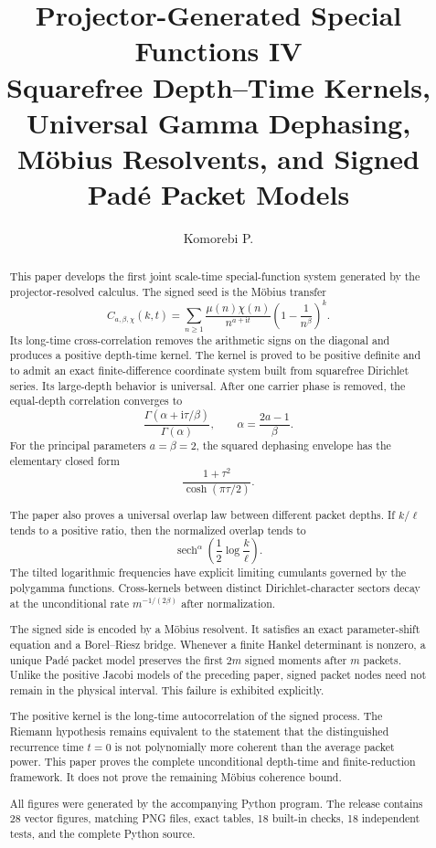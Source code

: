 \documentclass[11pt,openany]{report}
\title{\textbf{Projector-Generated Special Functions IV}\\[0.25em]
\Large Squarefree Depth--Time Kernels, Universal Gamma Dephasing, M\"obius Resolvents, and Signed Pad\'e Packet Models}
\author{Komorebi P.}
\date{}
\theoremstyle{definition}
\theoremstyle{remark}
\newcommand{\ii}{\mathrm i}
\newcommand{\sech}{\operatorname{sech}}
\begin{document}
\hypersetup{pageanchor=false}
\maketitle

\begin{abstract}
This paper develops the first joint scale-time special-function system generated by the projector-resolved calculus. The signed seed is the M\"obius transfer
\[
C_{a,\beta,\chi}(k,t)
=
\sum_{n\ge1}
\frac{\mu(n)\chi(n)}{n^{a+\ii t}}
\left(1-\frac1{n^\beta}\right)^k.
\]
Its long-time cross-correlation removes the arithmetic signs on the diagonal and produces a positive depth-time kernel. The kernel is proved to be positive definite and to admit an exact finite-difference coordinate system built from squarefree Dirichlet series. Its large-depth behavior is universal. After one carrier phase is removed, the equal-depth correlation converges to
\[
\frac{\Gamma(\alpha+\ii\tau/\beta)}{\Gamma(\alpha)},
\qquad
\alpha=\frac{2a-1}{\beta}.
\]
For the principal parameters $a=\beta=2$, the squared dephasing envelope has the elementary closed form
\[
\frac{1+\tau^2}{\cosh(\pi\tau/2)}.
\]

The paper also proves a universal overlap law between different packet depths. If $k/\ell$ tends to a positive ratio, then the normalized overlap tends to
\[
\sech^\alpha\!\left(\frac12\log\frac{k}{\ell}\right).
\]
The tilted logarithmic frequencies have explicit limiting cumulants governed by the polygamma functions. Cross-kernels between distinct Dirichlet-character sectors decay at the unconditional rate $m^{-1/(2\beta)}$ after normalization.

The signed side is encoded by a M\"obius resolvent. It satisfies an exact parameter-shift equation and a Borel--Riesz bridge. Whenever a finite Hankel determinant is nonzero, a unique Pad\'e packet model preserves the first $2m$ signed moments after $m$ packets. Unlike the positive Jacobi models of the preceding paper, signed packet nodes need not remain in the physical interval. This failure is exhibited explicitly.

The positive kernel is the long-time autocorrelation of the signed process. The Riemann hypothesis remains equivalent to the statement that the distinguished recurrence time $t=0$ is not polynomially more coherent than the average packet power. This paper proves the complete unconditional depth-time and finite-reduction framework. It does not prove the remaining M\"obius coherence bound.

All figures were generated by the accompanying Python program. The release contains 28 vector figures, matching PNG files, exact tables, 18 built-in checks, 18 independent tests, and the complete Python source.
\end{abstract}
\end{document}

